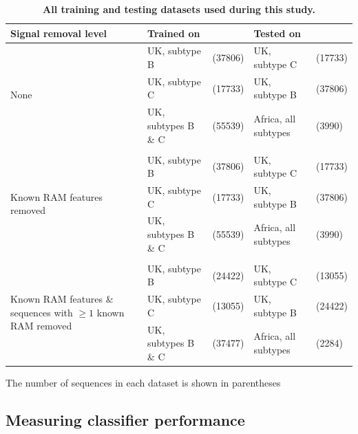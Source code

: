 \documentclass[
  11,
]{scrbook}
\begin{document}
\begin{table}[!htt]
\centering
\caption{\textbf{All training and testing datasets used during this study.}}
\begin{tabular}{@{}p{.25\linewidth}llll@{}}
\hline
Signal removal level & Trained on & & Tested on & \\ \hline
\multirow[t]{3}{*}{None} & UK, subtype B & (37806) & UK, subtype C & (17733) \\
 & UK, subtype C & (17733) & UK, subtype B & (37806) \\
 & UK, subtypes B \& C & (55539) & Africa, all subtypes & (3990)  \\
 & & & & \\
\multirow[t]{3}{*}{\parbox{.8\linewidth}{Known RAM features removed}} & UK, subtype B & (37806) & UK, subtype C & (17733) \\
 & UK, subtype C & (17733) & UK, subtype B & (37806) \\
 & UK, subtypes B \& C & (55539) & Africa, all subtypes & (3990)  \\
 & & & & \\
\multirow[t]{3}{*}{\parbox{.8\linewidth}{Known RAM features \& sequences with $\geq1$ known RAM removed}} & UK, subtype B & (24422) & UK, subtype C & (13055) \\
 & UK, subtype C & (13055) & UK, subtype B & (24422) \\
 & UK, subtypes B \& C & (37477) & Africa, all subtypes & (2284) \\ \hline
\end{tabular}
\begin{flushleft}
  The number of sequences in each dataset is shown in parentheses
\end{flushleft}
\label{tab:tableTrainTest}
\end{table}

\hypertarget{measuring-classifier-performance}{%
\subsection{Measuring classifier performance}\label{measuring-classifier-performance}}
\end{document}
